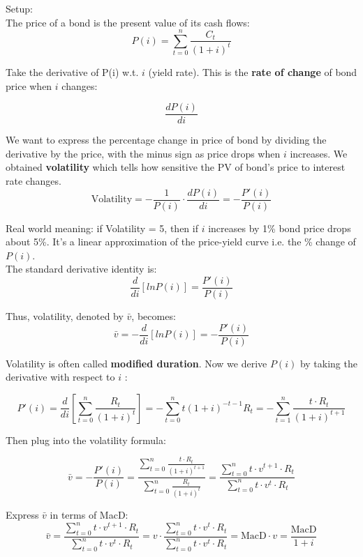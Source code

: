 \begin{comments}
    Setup: \\

    The price of a bond is the present value of its cash flows:
    \[
            P(i) = \sum_{t=0}^{n} \frac{C_t}{(1+i)^t}
    \]  

    Take the derivative of P(i) w.t. $i$ (yield rate). This is the \textbf{rate of change}
    of bond price when $i$ changes: 

    \[
            \frac{dP(i)}{di}
    \]

    We want to express the percentage change in price of bond by dividing the derivative 
    by the price, with the minus sign as price drops when $i$ increases. We obtained \textbf{volatility}
    which tells how sensitive the PV of bond's price to interest rate changes. 
    \[
        \text{Volatility} = - \frac{1}{P(i)} \cdot \frac{dP(i)}{di} = -\frac{P'(i)}{P(i)}
    \]

    Real world meaning: if Volatility = 5, then if $i$ increases by 1\% bond price drops about 5\%. 
    It's a linear approximation of the price-yield curve i.e. the \% change of $P(i)$. \\

    The standard derivative identity is: 
    \[
        \frac{d}{di}[lnP(i)] = \frac{P'(i)}{P(i)}
    \]

    Thus, volatility, denoted by $\bar{v}$, becomes: 
    \[
        \bar{v} = - \frac{d}{di}[lnP(i)] = - \frac{P'(i)}{P(i)}
    \]

    Volatility is often called \textbf{modified duration}. Now we derive $P(i)$ by taking
    the derivative with respect to $i$ : 

    \[
    P'(i) = \frac{d}{di} \left[ \sum_{t=0}^n \frac{R_t}{(1+i)^t} \right] = - \sum_{t=0}^n t(1+i)^{-t-1} R_t = - \sum_{t=1}^{n} \frac{t \cdot R_t}{(1+i)^{t+1}}
    \]

    Then plug into the volatility formula:

    \[
    \bar{v} = -\frac{P'(i)}{P(i)} = \frac{\sum_{t=0}^{n} \frac{t \cdot R_t}{(1+i)^{t+1}}}{\sum_{t=0}^{n} \frac{R_t}{(1+i)^{t}}} = \frac{\sum_{t=0}^{n} t \cdot v^{t+1} \cdot R_t} {\sum_{t=0}^{n} t \cdot v^{t} \cdot R_t}
    \]

    Express $\bar{v}$ in terms of MacD: 
    \[ \bar{v} =  \frac{\sum_{t=0}^{n} t \cdot v^{t+1} \cdot R_t} {\sum_{t=0}^{n} t \cdot v^{t} \cdot R_t} 
    = v \cdot  \frac{\sum_{t=0}^{n} t \cdot v^{t} \cdot R_t} {\sum_{t=0}^{n} t \cdot v^{t} \cdot R_t} = \text{MacD} \cdot v = \frac{\text{MacD}}{1+i}
    \]
\end{comments}
    

